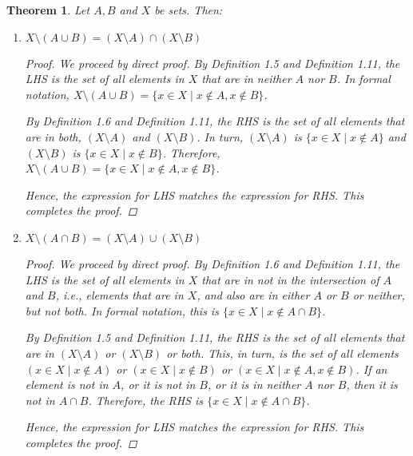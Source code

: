 \documentclass[11pt]{article}
\newtheorem{theorem}{Theorem}[section]
\theoremstyle{definition}
\numberwithin{equation}{subsection}
\begin{document}
\begin{theorem} 
Let $A,B$ and $X$ be sets.  Then:
\begin{enumerate}
\item[a)]
$X\setminus (A\cup B)=(X\setminus A)\cap (X\setminus B)$

\begin{proof}
We proceed by direct proof. By Definition 1.5 and Definition 1.11, the LHS is the set of all elements in $X$ that are in neither $A$ nor $B$. In formal notation, $X\setminus (A\cup B) = \{x \in X \mid x \notin A, x \notin B\}$.

By Definition 1.6 and Definition 1.11, the RHS is the set of all elements that are in both, $(X \setminus A)$ and $(X \setminus B)$. In turn, $(X \setminus A)$ is $\{x \in X \mid x \notin A\}$ and $(X \setminus B)$ is $\{x \in X \mid x \notin B\}$. Therefore, $X\setminus (A\cup B) = \{x \in X \mid x \notin A, x \notin B\}$.

Hence, the expression for LHS matches the expression for RHS. This completes the proof.


\renewcommand\qedsymbol{QED}

\end{proof}

\item[b)]
$X\setminus (A\cap B)=(X\setminus A)\cup (X\setminus B)$

\begin{proof}

We proceed by direct proof. By Definition 1.6 and Definition 1.11, the LHS is the set of all elements in $X$ that are in not in the intersection of $A$ and $B$, i.e., elements that are in $X$, and also are in either $A$ or $B$ or neither, but not both. In formal notation, this is $\{x \in X \mid x \notin A\cap B\}$.

By Definition 1.5 and Definition 1.11, the RHS is the set of all elements that are in $(X \setminus A)$ or $(X \setminus B)$ or both. This, in turn, is the set of all elements $(x \in X \mid x \notin A)$ or $(x \in X \mid x \notin B)$ or $(x \in X \mid x \notin A, x \notin B)$. If an element is not in $A$, or it is not in $B$, or it is in neither $A$ nor $B$, then it is not in $A \cap B$. Therefore, the RHS is $\{x \in X \mid x \notin A\cap B\}$.

Hence, the expression for LHS matches the expression for RHS. This completes the proof.


\renewcommand\qedsymbol{QED}

\end{proof}

\end{enumerate}
\end{theorem}
\end{document}
